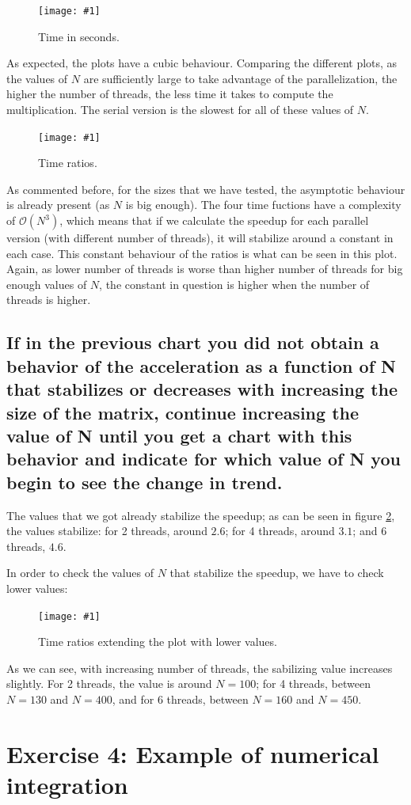 \documentclass{article}
\newcommand{\myFigure}[4]{%
    \begin{figure}[!ht]
        \texttt{[image: \#1]}
        \centering
        \caption{#2}
        \label{#3}
    \end{figure}
}
\newcommand{\question}[1]{\subsection{#1}}
\begin{document}
\myFigure{../material/outputs/out3/test_cl0/t_fig.png}{Time in seconds.}{times_e3}{0.65}

As expected, the plots have a cubic behaviour. Comparing the different plots, as the values of $N$ are sufficiently large to take advantage of the parallelization, the higher the number of threads, the less time it takes to compute the multiplication. The serial version is the slowest for all of these values of $N$.

\myFigure{../material/outputs/out3/test_cl0/r_fig.png}{Time ratios.}{ratios}{0.65}

As commented before, for the sizes that we have tested, the asymptotic behaviour is already present (as $N$ is big enough). The four time fuctions have a complexity of $\mathcal{O}(N^3)$, which means that if we calculate the speedup for each parallel version (with different number of threads), it will stabilize around a constant in each case. This constant behaviour of the ratios is what can be seen in this plot. Again, as lower number of threads is worse than higher number of threads for big enough values of $N$, the constant in question is higher when the number of threads is higher.

\question{If in the previous chart you did not obtain a behavior of the acceleration as a function of N that stabilizes or decreases with increasing the size of the matrix, continue increasing the value of N until you get a chart with this behavior and indicate for which value of N you begin to see the change in trend.}

The values that we got already stabilize the speedup; as can be seen in figure \ref{ratios}, the values stabilize: for 2 threads, around $2.6$; for 4 threads, around $3.1$; and 6 threads, $4.6$.

In order to check the values of $N$ that stabilize the speedup, we have to check lower values:

\myFigure{../material/outputs/out3/test_cl0_extended/r_fig.png}{Time ratios extending the plot with lower values.}{ratios_extended}{0.63}

As we can see, with increasing number of threads, the sabilizing value increases slightly. For 2 threads, the value is around $N=100$; for 4 threads, between $N=130$ and $N=400$, and for 6 threads, between $N=160$ and $N=450$.


\pagebreak

\section{Exercise 4: Example of numerical integration}
\end{document}
